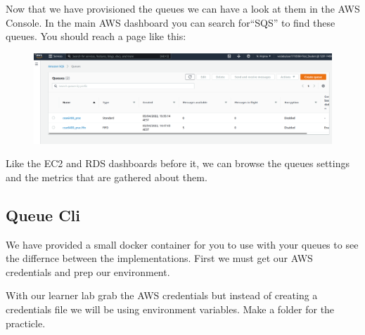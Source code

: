 \documentclass{csse4400}
\begin{document}
Now that we have provisioned the queues we can have a look at them in the AWS Console.
In the main AWS dashboard you can search for``SQS'' to find these queues.
You should reach a page like this:

\begin{figure}[H]
  \includegraphics[width=\textwidth]{images/sqspanel}
\end{figure}

Like the EC2 and RDS dashboards before it, we can browse the queues settings and the metrics that are gathered about them.
  

\subsection{Queue Cli}

We have provided a small docker container for you to use with your queues to see the differnce between the implementations. First we must get our AWS credentials and prep our environment.

With our learner lab grab the AWS credentials but instead of creating a credentials file we will be using environment variables.
Make a folder for the practicle.

\end{document}
